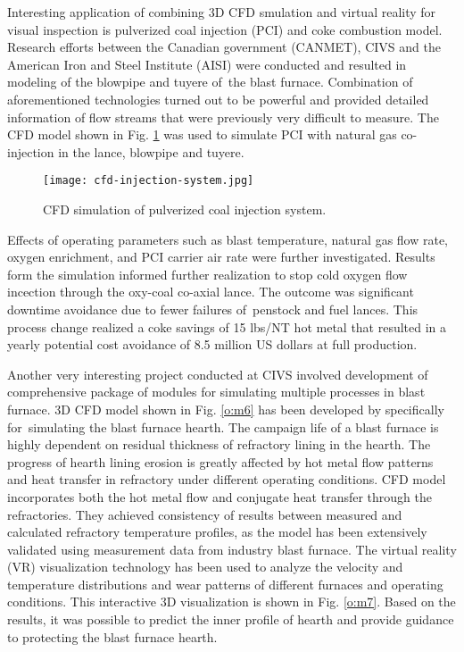 Interesting application of combining 3D CFD smulation and virtual reality for visual inspection is pulverized coal injection (PCI) and coke combustion model. Research efforts between the Canadian government (CANMET), CIVS and the American Iron and Steel Institute (AISI) were conducted and resulted in modeling of the blowpipe and tuyere of~the blast furnace. Combination of aforementioned technologies turned out to be powerful and provided detailed information of flow streams that were previously
very difficult to measure. The CFD model shown in Fig. \ref{o:m8} was used to simulate PCI with natural gas co-injection in the lance, blowpipe and tuyere.

\begin{figure}[ht!]
	\centering
	\texttt{[image: cfd-injection-system.jpg]}
	\caption{CFD simulation of pulverized coal injection system.}
	\label{o:m8}
\end{figure}

Effects of operating parameters such as blast temperature, natural gas flow rate, oxygen enrichment, and PCI carrier air rate were further investigated. Results form the simulation informed further realization to stop cold oxygen flow incection through the oxy-coal co-axial lance. The outcome was significant downtime avoidance due to fewer failures of~penstock and fuel lances. This process change realized a coke savings of 15 lbs/NT hot metal that resulted in a yearly potential cost avoidance of 8.5 million US dollars at full production.

Another very interesting project conducted at CIVS involved development of comprehensive package of modules for simulating multiple processes in blast furnace. 
3D CFD model shown in Fig. \ref{o:m6} has been developed by \citet{Zheng2014} specifically for~simulating the blast furnace hearth. The campaign life of a blast furnace is highly dependent on residual thickness of refractory lining in the hearth. The progress of hearth lining erosion is greatly affected by hot metal flow patterns and heat transfer in refractory under different operating conditions. CFD model incorporates both the hot metal flow and conjugate heat transfer through the refractories. They achieved consistency of results between measured and calculated refractory temperature profiles, as the model has been extensively validated using measurement data from industry blast furnace. The virtual reality (VR) visualization technology has been used to analyze the velocity and temperature distributions and wear patterns of different furnaces and operating conditions. This interactive 3D visualization is shown in Fig. \ref{o:m7}. Based on the results, it was possible to predict the inner profile of hearth and provide guidance to protecting the blast furnace hearth.

